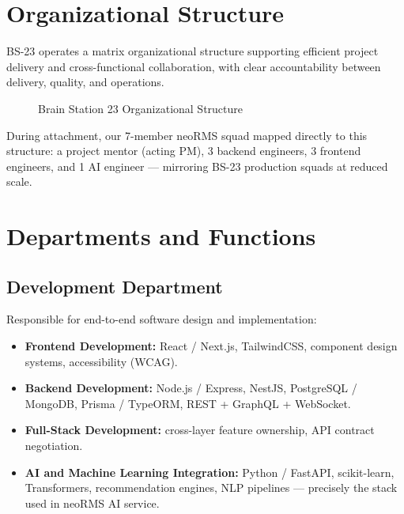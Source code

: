 \section{Organizational Structure}
\label{sec:org_structure}

BS-23 operates a matrix organizational structure supporting efficient project delivery and cross-functional collaboration, with clear accountability between delivery, quality, and operations.

\begin{figure}[H]
\centering
{}
\caption{Brain Station 23 Organizational Structure}
\label{fig:org_structure}
\end{figure}

During attachment, our 7-member neoRMS squad mapped directly to this structure: a project mentor (acting PM), 3 backend engineers, 3 frontend engineers, and 1 AI engineer --- mirroring BS-23 production squads at reduced scale.

\section{Departments and Functions}
\label{sec:departments}

\subsection{Development Department}
Responsible for end-to-end software design and implementation:
\begin{itemize}
\item \textbf{Frontend Development:} React / Next.js, TailwindCSS, component design systems, accessibility (WCAG).
\item \textbf{Backend Development:} Node.js / Express, NestJS, PostgreSQL / MongoDB, Prisma / TypeORM, REST + GraphQL + WebSocket.
\item \textbf{Full-Stack Development:} cross-layer feature ownership, API contract negotiation.
\item \textbf{AI and Machine Learning Integration:} Python / FastAPI, scikit-learn, Transformers, recommendation engines, NLP pipelines --- precisely the stack used in neoRMS AI service.
\end{itemize}

